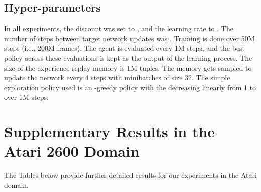 \documentclass[letterpaper]{article}
\begin{document}
\subsection*{Hyper-parameters}

In all experiments, the discount was set to , and the learning rate to . 
The number of steps between target network updates was . Training is done over 50M steps (i.e., 200M frames). The agent is evaluated every 1M steps, and the best policy across these evaluations is kept as the output of the learning process. 
The size of the experience replay memory is 1M tuples. The memory gets sampled to update the network every 4 steps with minibatches of size 32.
The simple exploration policy used is an -greedy policy with the  decreasing linearly from 1 to  over 1M steps.

\section*{Supplementary Results in the Atari 2600 Domain}
The Tables below provide further detailed results for our experiments in the Atari domain.
\end{document}
